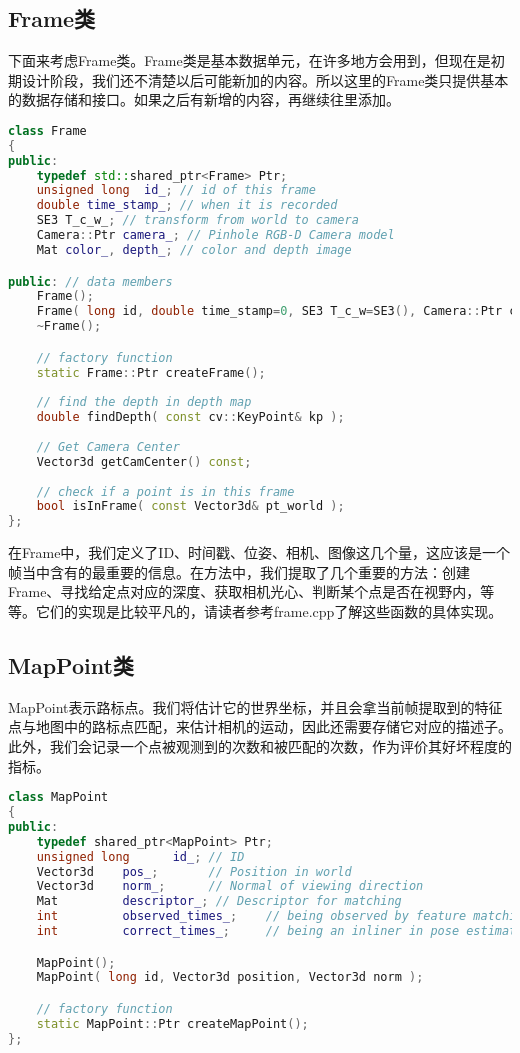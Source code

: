 \subsection{Frame类}
下面来考虑Frame类。Frame类是基本数据单元，在许多地方会用到，但现在是初期设计阶段，我们还不清楚以后可能新加的内容。所以这里的Frame类只提供基本的数据存储和接口。如果之后有新增的内容，再继续往里添加。

\begin{lstlisting}[language=c++,caption=slambook/project/0.1/include/myslam/frame.h]
class Frame
{
public:
	typedef std::shared_ptr<Frame> Ptr;
	unsigned long  id_; // id of this frame
	double time_stamp_; // when it is recorded
	SE3 T_c_w_; // transform from world to camera
	Camera::Ptr camera_; // Pinhole RGB-D Camera model 
	Mat color_, depth_; // color and depth image 

public: // data members 
	Frame();
	Frame( long id, double time_stamp=0, SE3 T_c_w=SE3(), Camera::Ptr camera=nullptr, Mat color=Mat(), Mat depth=Mat() );
	~Frame();

	// factory function
	static Frame::Ptr createFrame(); 
	
	// find the depth in depth map
	double findDepth( const cv::KeyPoint& kp );
	
	// Get Camera Center
	Vector3d getCamCenter() const;
	
	// check if a point is in this frame 
	bool isInFrame( const Vector3d& pt_world );
};
\end{lstlisting}

在Frame中，我们定义了ID、时间戳、位姿、相机、图像这几个量，这应该是一个帧当中含有的最重要的信息。在方法中，我们提取了几个重要的方法：创建Frame、寻找给定点对应的深度、获取相机光心、判断某个点是否在视野内，等等。它们的实现是比较平凡的，请读者参考frame.cpp了解这些函数的具体实现。

\subsection{MapPoint类}
MapPoint表示路标点。我们将估计它的世界坐标，并且会拿当前帧提取到的特征点与地图中的路标点匹配，来估计相机的运动，因此还需要存储它对应的描述子。此外，我们会记录一个点被观测到的次数和被匹配的次数，作为评价其好坏程度的指标。

\begin{lstlisting}[language=c++,caption=slambook/project/0.1/include/myslam/mappoint.h]
class MapPoint
{
public:
	typedef shared_ptr<MapPoint> Ptr;
	unsigned long      id_; // ID
	Vector3d    pos_;       // Position in world
	Vector3d    norm_;      // Normal of viewing direction 
	Mat         descriptor_; // Descriptor for matching 
	int         observed_times_;    // being observed by feature matching algo.
	int         correct_times_;     // being an inliner in pose estimation

	MapPoint();
	MapPoint( long id, Vector3d position, Vector3d norm );

	// factory function
	static MapPoint::Ptr createMapPoint();
};
\end{lstlisting}

